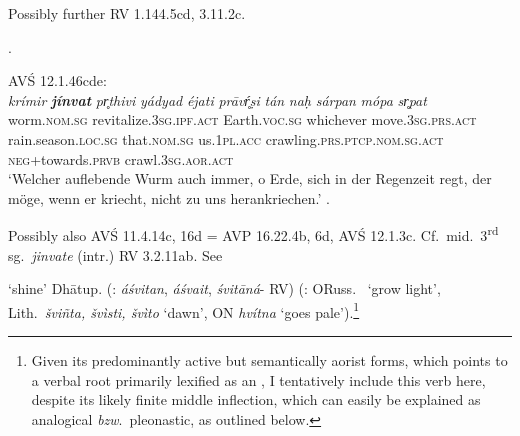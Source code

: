 \documentclass[output=paper,colorlinks,citecolor=brown]{langscibook}
\begin{document}
\begin{exe}
\begin{xlist}
\smallskip
{ Possibly further RV 1.144.5cd, 3.11.2c.}

.\\

\smallskip

AVŚ 12.1.46cde:\\ \gll 
\textit{krímir} {\textbf{\textit{jínvat}} } \textit{pr̥thivi}  \textit{yádyad} \textit{éjati} \textit{prāvŕ̥ṣi}  \textit{tán} \textit{naḥ} \textit{sárpan} \textit{mópa} \textit{sr̥pat}\\ 
worm.\textsc{nom.sg} revitalize.\textsc{3sg.ipf.act} Earth.\textsc{voc.sg} whichever move.\textsc{3sg.prs.act} rain.season.\textsc{loc.sg} that.\textsc{nom.sg} us.\textsc{1pl.acc} crawling.\textsc{prs.ptcp.nom.sg.act} \textsc{neg}+towards.\textsc{prvb} crawl.\textsc{3sg.aor.act}\\
\glt `Welcher auflebende Wurm auch immer, o Erde, sich in der Regenzeit regt, der möge, wenn er kriecht, nicht zu uns herankriechen.' \citep[105]{Zasada2021}.\\

\smallskip

{ Possibly also AVŚ 11.4.14c, 16d = AVP 16.22.4b, 6d, AVŚ 12.1.3c. Cf.\ mid.\ 3\textsuperscript{rd} sg.\ \textit{jinvate} (intr.) RV 3.2.11ab. See \citealt[104ff.]{Zasada2021}}

\ex  {} ‘shine’ Dhātup. (: \textit{áśvitan}, \textit{áśvait}, \textit{śvitāná}{}- RV) (: ORuss.\  ‘grow light', Lith.\ \textit{šviñta, švìsti, švìto} ‘dawn', ON \textit{hvítna} ‘goes pale’).\footnote{Given its predominantly active but semantically  aorist forms, which points to a verbal root primarily lexified as an , I tentatively include this verb here, despite its likely finite middle inflection, which can easily be explained as analogical \emph{bzw}.\ pleonastic, as outlined below.}
    \end{xlist}
\end{exe} 
\end{document}
